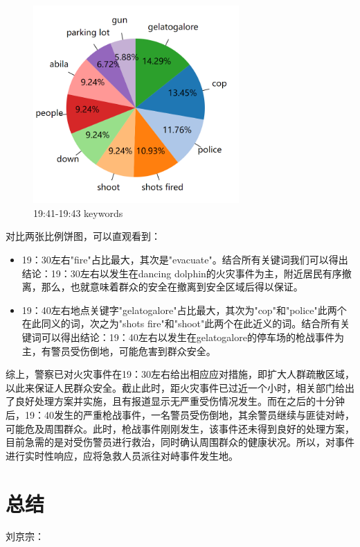 \documentclass[a4paper]{article}
\begin{document}
\begin{figure}[H]
  \centering
  \includegraphics[width=0.7\textwidth]{images/3-7.png}
  \caption{19:41-19:43 keywords}\label{fig:3-7}
  \vspace{\baselineskip}
\end{figure}

对比两张比例饼图，可以直观看到：
\begin{itemize}
  \item 19：30左右"fire"占比最大，其次是"evacuate"。结合所有关键词我们可以得出结论：19：30左右以发生在dancing dolphin的火灾事件为主，附近居民有序撤离，那么，也就意味着群众的安全在撤离到安全区域后得以保证。

  \item 19：40左右地点关键字"gelatogalore"占比最大，其次为"cop"和"police"此两个在此同义的词，次之为"shots fire"和"shoot"此两个在此近义的词。结合所有关键词可以得出结论：19：40左右以发生在gelatogalore的停车场的枪战事件为主，有警员受伤倒地，可能危害到群众安全。
\end{itemize}

综上，警察已对火灾事件在19：30左右给出相应应对措施，即扩大人群疏散区域，以此来保证人民群众安全。截止此时，距火灾事件已过近一个小时，相关部门给出了良好处理方案并实施，且有报道显示无严重受伤情况发生。而在之后的十分钟后，19：40发生的严重枪战事件，一名警员受伤倒地，其余警员继续与匪徒对峙，可能危及周围群众。此时，枪战事件刚刚发生，该事件还未得到良好的处理方案，目前急需的是对受伤警员进行救治，同时确认周围群众的健康状况。所以，对事件进行实时性响应，应将急救人员派往对峙事件发生地。


\section{总结}
刘京宗：
\end{document}
